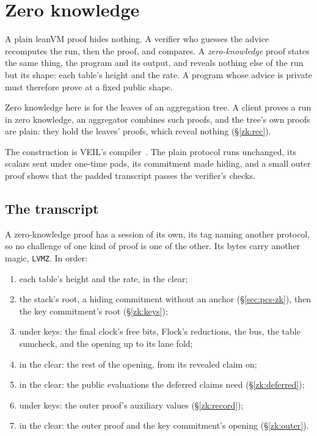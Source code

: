 \section{Zero knowledge}\label{annex:zk}

A plain leanVM proof hides nothing. A verifier who guesses the advice recomputes the run, then the proof, and compares. A \emph{zero-knowledge} proof states the same thing, the program and its output, and reveals nothing else of the run but its shape: each table's height and the rate. A program whose advice is private must therefore prove at a fixed public shape.

Zero knowledge here is for the leaves of an aggregation tree. A client proves a run in zero knowledge, an aggregator combines such proofs, and the tree's own proofs are plain: they hold the leaves' proofs, which reveal nothing (\S\ref{zk:rec}).

The construction is VEIL's compiler~\cite{DHRR26}. The plain protocol runs unchanged, its scalars sent under one-time pads, its commitment made hiding, and a small outer proof shows that the padded transcript passes the verifier's checks.

\subsection{The transcript}\label{zk:transcript}

A zero-knowledge proof has a session of its own, its tag naming another protocol, so no challenge of one kind of proof is one of the other. Its bytes carry another magic, \texttt{LVMZ}. In order:
\begin{enumerate}[itemsep=1pt,topsep=2pt]
\item each table's height and the rate, in the clear;
\item the stack's root, a hiding commitment without an anchor (\S\ref{sec:pcs-zk}), then the key commitment's root (\S\ref{zk:keys});
\item under keys: the final clock's free bits, Flock's reductions, the bus, the table sumcheck, and the opening up to its lane fold;
\item in the clear: the rest of the opening, from its revealed claim on;
\item in the clear: the public evaluations the deferred claims need (\S\ref{zk:deferred});
\item under keys: the outer proof's auxiliary values (\S\ref{zk:record});
\item in the clear: the outer proof and the key commitment's opening (\S\ref{zk:outer}).
\end{enumerate}

